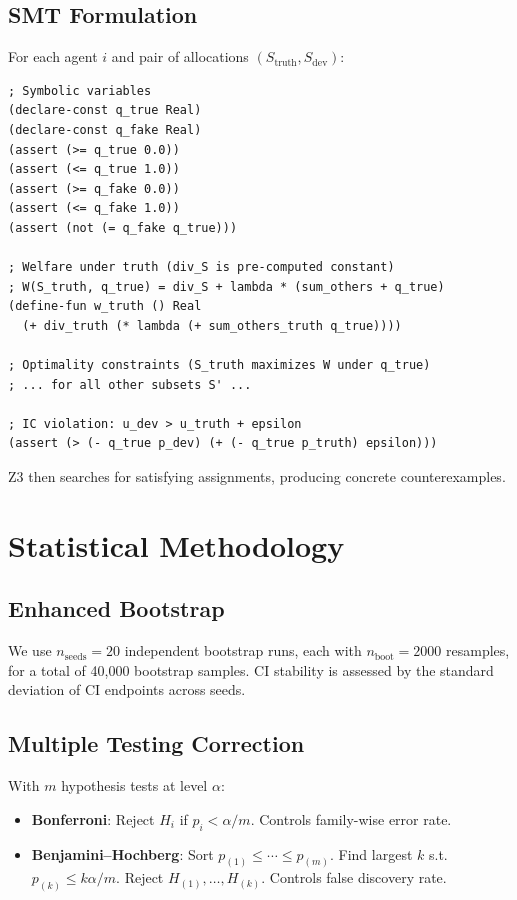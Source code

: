 \documentclass[10pt]{article}
\begin{document}
\subsection{SMT Formulation}

For each agent $i$ and pair of allocations $(S_{\text{truth}}, S_{\text{dev}})$:

\begin{verbatim}
; Symbolic variables
(declare-const q_true Real)
(declare-const q_fake Real)
(assert (>= q_true 0.0))
(assert (<= q_true 1.0))
(assert (>= q_fake 0.0))
(assert (<= q_fake 1.0))
(assert (not (= q_fake q_true)))

; Welfare under truth (div_S is pre-computed constant)
; W(S_truth, q_true) = div_S + lambda * (sum_others + q_true)
(define-fun w_truth () Real
  (+ div_truth (* lambda (+ sum_others_truth q_true))))

; Optimality constraints (S_truth maximizes W under q_true)
; ... for all other subsets S' ...

; IC violation: u_dev > u_truth + epsilon
(assert (> (- q_true p_dev) (+ (- q_true p_truth) epsilon)))
\end{verbatim}

Z3 then searches for satisfying assignments, producing concrete counterexamples.

\section{Statistical Methodology}
\label{app:stats}

\subsection{Enhanced Bootstrap}

We use $n_{\text{seeds}} = 20$ independent bootstrap runs, each with $n_{\text{boot}} = 2000$ resamples, for a total of 40{,}000 bootstrap samples.
CI stability is assessed by the standard deviation of CI endpoints across seeds.

\subsection{Multiple Testing Correction}

With $m$ hypothesis tests at level $\alpha$:
\begin{itemize}
\item \textbf{Bonferroni}: Reject $H_i$ if $p_i < \alpha/m$. Controls family-wise error rate.
\item \textbf{Benjamini--Hochberg}: Sort $p_{(1)} \leq \cdots \leq p_{(m)}$. Find largest $k$ s.t.\ $p_{(k)} \leq k\alpha/m$. Reject $H_{(1)}, \ldots, H_{(k)}$. Controls false discovery rate.
\end{itemize}
\end{document}
